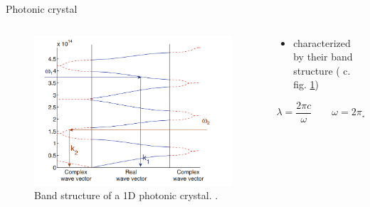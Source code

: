 \begin{frame}{Photonic crystal}

  \begin{columns}

    \begin{column}{0.49\textwidth}
      \begin{figure}
        \centering
        \includegraphics[width=1\textwidth]{./bilder/band_structure.png}
        \caption{Band structure of a 1D photonic crystal. \cite{intro_pho}.}
        \label{fig: band_structure}
      \end{figure}
    \end{column}

    \begin{column}{0.49\textwidth}
    \begin{itemize}
      \setlength\itemsep{1.2em}
      \item{characterized by their band structure ( c. fig. \ref{fig: band_structure}) }
    \end{itemize}
    \begin{equation*}
      \lambda=\frac{2\pi c}{\omega}\qquad \omega =2\pi f
    \end{equation*}
    \end{column}

  \end{columns}

\end{frame}


